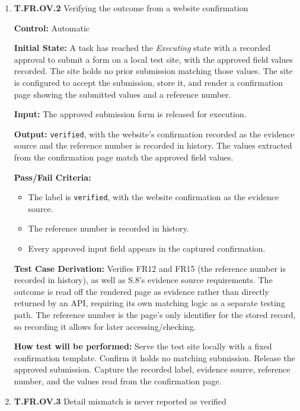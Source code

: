 \documentclass[12pt, titlepage]{article}
\begin{document}
\begin{enumerate}
\item{\textbf{T.FR.OV.2} Verifying the outcome from a website confirmation\\}\label{test:T.FR.OV.2}

\textbf{Control:} Automatic
					
\textbf{Initial State:} A task has reached the \textit{Executing} state with a recorded approval to submit a form on a local test site,
with the approved field values recorded. The site holds no prior submission matching those values. The site is configured to accept 
the submission, store it, and render a confirmation page showing the submitted values and a reference number.
					
\textbf{Input:} The approved submission form is released for execution.
					
\textbf{Output:} \texttt{verified}, with the website's confirmation recorded as the evidence source and the reference number is recorded in history.
The values extracted from the confirmation page match the approved field values.

\textbf{Pass/Fail Criteria:}
\begin{itemize}
  \item The label is \texttt{verified}, with the website confirmation as the evidence source.
  \item The reference number is recorded in history.
  \item Every approved input field appears in the captured confirmation.
\end{itemize}

\textbf{Test Case Derivation:} Verifies FR12 and FR15 (the reference number is recorded in history), as well as S.8's evidence source requirements. The outcome is read off the rendered page as evidence 
rather than directly returned by an API, requiring its own matching logic as a separate testing path. The reference number is the page's only identifier for 
the stored record, so recording it allows for later accessing/checking.

\textbf{How test will be performed:} Serve the test site locally with a fixed confirmation template. Confirm it holds no matching submission. Release the approved submission.
Capture the recorded label, evidence source, reference number, and the values read from the confirmation page.


\item{\textbf{T.FR.OV.3} Detail mismatch is never reported as verified\\}\label{test:T.FR.OV.3}


\end{enumerate}
\end{document}
